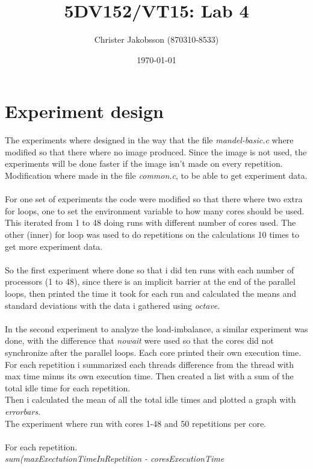 \documentclass[a4paper,12pt]{article}
\begin{document}
\title{5DV152/VT15: Lab 4}
\author{Christer Jakobsson (870310-8533)}
\date{\today}
\maketitle


\section{Experiment design}
\label{sec:experiment-design}

The experiments where designed in the way that the file \emph{mandel-basic.c} where modified so that there where no image produced. Since the image is not used, the experiments will be done faster if the image isn't made on every repetition. 
Modification where made in the file \emph{common.c}, to be able to get experiment data.
\\\\
For one set of experiments the code were modified so that there where two extra for loops, one to set the environment variable to how many cores should be used. This iterated from 1 to 48 doing runs with different number of cores used.
The other (inner) for loop was used to do repetitions on the calculations 10 times to get more experiment data.\\
\\
So the first experiment where done so that i did ten runs with each number of processors (1 to 48), since there is an implicit barrier at the end of the parallel loops, then printed the time it took for each run and calculated the means and standard deviations with the data i gathered using \emph{octave}.\\
\\
In the second experiment to analyze the load-imbalance, a similar experiment was done, with the difference that \emph{nowait} were used so that the cores did not synchronize after the parallel loops. Each core printed their own execution time.
For each repetition i summarized each threads difference from the thread with max time minus its own execution time.
Then created a list with a sum of the total idle time for each repetition.\\
Then i calculated the mean of all the total idle times and plotted a graph with \emph{errorbars}.
\\The experiment where run with cores 1-48 and 50 repetitions per core.\\
\\For each repetition. \\\emph{sum(maxExectutionTimeInRepetition - coresExecutionTime}\\
\end{document}
